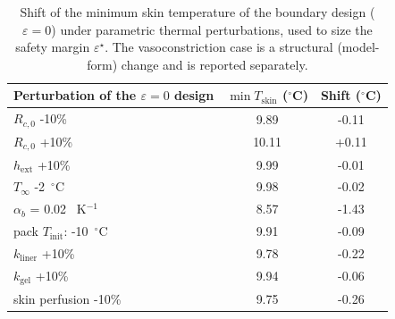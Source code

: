 \begin{table}[!htbp]
\centering
\caption{Shift of the minimum skin temperature of the boundary design ($\varepsilon=0$) under parametric thermal perturbations, used to size the safety margin $\varepsilon^\star$. The vasoconstriction case is a structural (model-form) change and is reported separately.}
\label{tab:margin_shifts}
\small
\setlength{\tabcolsep}{4pt}
\renewcommand{\arraystretch}{1.12}
\begin{tabular}{lcc}
\toprule
Perturbation of the $\varepsilon=0$ design & $\min T_{\mathrm{skin}}$ ($^\circ$C) & Shift ($^\circ$C) \\
\midrule
$R_{c,0}$ -10\% & 9.89 & -0.11 \\
$R_{c,0}$ +10\% & 10.11 & +0.11 \\
$h_{\mathrm{ext}}$ +10\% & 9.99 & -0.01 \\
$T_\infty$ -2~$^\circ$C & 9.98 & -0.02 \\
$\alpha_b$ = 0.02 ~K$^{-1}$ & 8.57 & -1.43 \\
pack $T_{\mathrm{init}}$: -10~$^\circ$C & 9.91 & -0.09 \\
$k_{\mathrm{liner}}$ +10\% & 9.78 & -0.22 \\
$k_{\mathrm{gel}}$ +10\% & 9.94 & -0.06 \\
skin perfusion -10\% & 9.75 & -0.26 \\
\bottomrule
\end{tabular}
\end{table}
